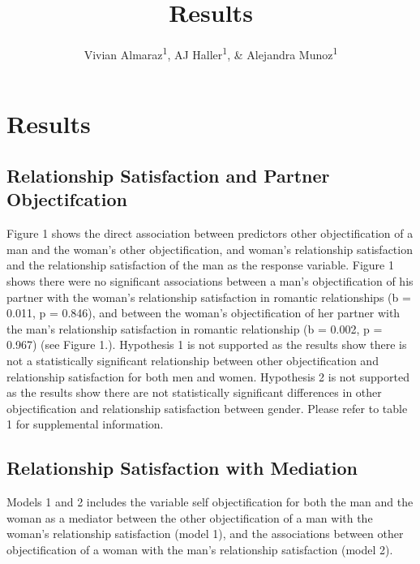 \documentclass[
  english,
  man]{apa6}
\title{Results}
\author{Vivian Almaraz\textsuperscript{1}, AJ Haller\textsuperscript{1}, \& Alejandra Munoz\textsuperscript{1}}
\date{}
\affiliation{\vspace{0.5cm}\textsuperscript{1} Smith College}
\begin{document}
\maketitle

\hypertarget{results}{%
\section{Results}\label{results}}

\hypertarget{relationship-satisfaction-and-partner-objectifcation}{%
\subsection{Relationship Satisfaction and Partner Objectifcation}\label{relationship-satisfaction-and-partner-objectifcation}}

Figure 1 shows the direct association between predictors other objectification of a man and the woman's other objectification, and woman's relationship satisfaction and the relationship satisfaction of the man as the response variable. Figure 1 shows there were no significant associations between a man's objectification of his partner with the woman's relationship satisfaction in romantic relationships (b = 0.011, p = 0.846), and between the woman's objectification of her partner with the man's relationship satisfaction in romantic relationship (b = 0.002, p = 0.967) (see Figure 1.). Hypothesis 1 is not supported as the results show there is not a statistically significant relationship between other objectification and relationship satisfaction for both men and women. Hypothesis 2 is not supported as the results show there are not statistically significant differences in other objectification and relationship satisfaction between gender. Please refer to table 1 for supplemental information.

\hypertarget{relationship-satisfaction-with-mediation}{%
\subsection{Relationship Satisfaction with Mediation}\label{relationship-satisfaction-with-mediation}}

Models 1 and 2 includes the variable self objectification for both the man and the woman as a mediator between the other objectification of a man with the woman's relationship satisfaction (model 1), and the associations between other objectification of a woman with the man's relationship satisfaction (model 2).
\end{document}
